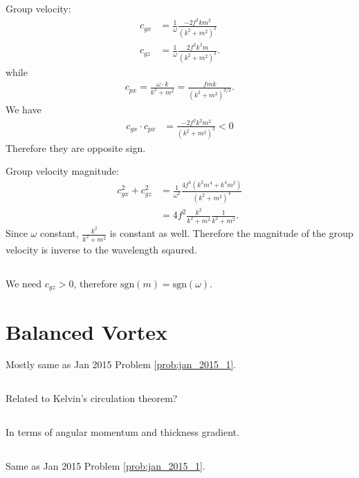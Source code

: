 \documentclass[11pt,letterpaper]{book}
\theoremstyle{definition}
\newcommand{\dsp}{\displaystyle}
\begin{document}
\subsection{}
Group velocity:
\begin{align*}
    c_{gx} &= \frac{1}{\omega}\frac{-2f^2km^2}{(k^2+m^2)^2}\\
    c_{gz} &= \frac{1}{\omega}\frac{2f^2k^2m}{(k^2+m^2)^2}.
\end{align*}
while
\begin{align*}
    c_{px} = \frac{\omega\cdot k}{k^2+m^2} = \frac{fm k}{(k^2+m^2)^{3/2}}.
\end{align*}
We have
\begin{align*}
    c_{gx}\cdot c_{px} &= \frac{-2f^2k^2m^2}{(k^2+m^2)^3}<0
\end{align*}
Therefore they are opposite sign.

Group velocity magnitude:
\begin{align*}
    c_{gx}^2+c_{gz}^2 &= \frac{1}{\omega^2}\frac{4f^4(k^2m^4+k^4m^2)}{(k^2+m^2)^4}\\
    &= {4f^2}\frac{k^2}{k^2+m^2}\frac{1}{k^2+m^2}.
\end{align*}
Since $\omega$ constant, $\dsp{\frac{k^2}{k^2+m^2}}$ is constant as well. Therefore the magnitude of the group velocity is inverse to the wavelength sqaured. 

\subsection{}
We need $c_{gz}>0$, therefore $\text{sgn}(m) = \text{sgn}(\omega)$.

\section{Balanced Vortex}
Mostly same as Jan 2015 Problem \ref{prob:jan_2015_1}.

\subsection{}
Related to Kelvin's circulation theorem?

\subsection{}
In terms of angular momentum and thickness gradient.

\subsection{}
Same as Jan 2015 Problem \ref{prob:jan_2015_1}.
\end{document}
